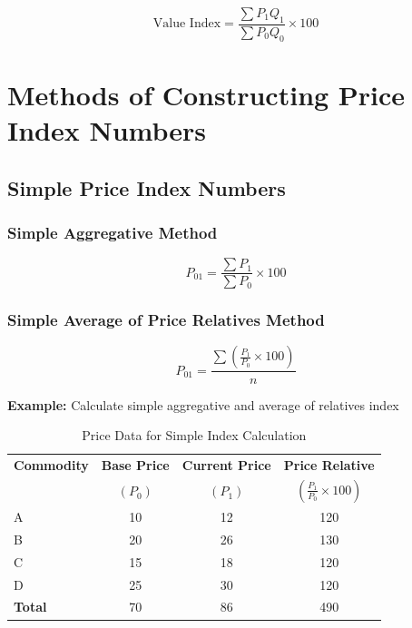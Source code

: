 \documentclass[twoside]{book}
\begin{document}
\begin{equation}
    \text{Value Index} = \frac{\sum P_1 Q_1}{\sum P_0 Q_0} \times 100
\end{equation}

\section{Methods of Constructing Price Index Numbers}

\subsection{Simple Price Index Numbers}

\subsubsection{Simple Aggregative Method}
\begin{equation}
    P_{01} = \frac{\sum P_1}{\sum P_0} \times 100
\end{equation}

\subsubsection{Simple Average of Price Relatives Method}
\begin{equation}
    P_{01} = \frac{\sum \left(\frac{P_1}{P_0} \times 100\right)}{n}
\end{equation}

\textbf{Example:} Calculate simple aggregative and average of relatives index

\begin{table}[h]
\centering
\caption{Price Data for Simple Index Calculation}
\begin{tabular}{lccc}
\toprule
\textbf{Commodity} & \textbf{Base Price} & \textbf{Current Price} & \textbf{Price Relative} \\
 & $(P_0)$ & $(P_1)$ & $\left(\frac{P_1}{P_0} \times 100\right)$ \\
\midrule
A & 10 & 12 & 120 \\
B & 20 & 26 & 130 \\
C & 15 & 18 & 120 \\
D & 25 & 30 & 120 \\
\midrule
\textbf{Total} & 70 & 86 & 490 \\
\bottomrule
\end{tabular}
\end{table}
\end{document}
